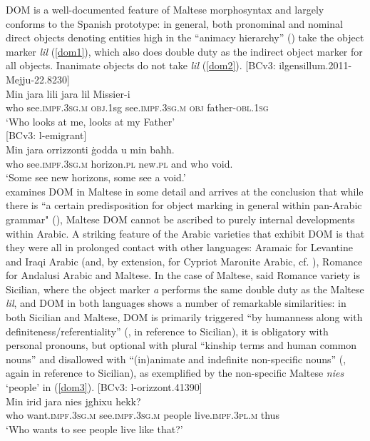 \documentclass[output=paper]{langsci/langscibook}
\begin{document}
DOM is a well-documented feature of Maltese morphosyntax and largely conforms to the Spanish prototype: in general, both pronominal and nominal direct objects denoting entities high in the ``animacy hierarchy'' (\citealt[55]{BorgAzzopardi-Alexander1997}) take the object marker \textit{lil} (\ref{dom1}), which also does double duty as the indirect object marker for all objects. Inanimate objects do not take \textit{lil} (\ref{dom2}).
\ea\label{dom1} 
{[BCv3: ilgensillum.2011-Mejju-22.8230]}\\
\gll Min jara lili jara lil Missier-i\\
	who see.\textsc{impf.3sg.m} \textsc{obj}.1sg see.\textsc{impf.3sg.m} \textsc{obj} father-\textsc{obl.1sg}\\
	\glt `Who looks at me, looks at my Father'\\
\z
\ea\label{dom2}
{[BCv3: l-emigrant]}\\
\gll Min jara orrizzonti ġodda u min baħħ.\\
	who see.\textsc{impf.3sg.m} horizon.\textsc{pl} new.\textsc{pl} and who void.\\
	\glt `Some see new horizons, some see a void.'\\
\z
 \cite{dohla2016} examines DOM in Maltese in some detail and arrives at the conclusion that while there is ``a certain predisposition for object marking in general within pan-Arabic grammar" (\citealt[169]{dohla2016}), Maltese DOM cannot be ascribed to purely internal developments within Arabic. A striking feature of the Arabic varieties that exhibit DOM is that they were all in prolonged contact with other languages: Aramaic for Levantine and Iraqi Arabic (and, by extension, for Cypriot Maronite Arabic, cf. \citealt[412]{Borg2004}), Romance for Andalusi Arabic and Maltese. In the case of Maltese, said Romance variety is Sicilian, where the object marker \textit{a} performs the same double duty as the Maltese \textit{lil}, and DOM in both languages shows a number of remarkable similarities: in both Sicilian and Maltese, DOM is primarily triggered ``by humanness along with definiteness/referentiality'' (\citealt[257]{iemmolo2010}, in reference to Sicilian), it is obligatory with personal pronouns, but optional with plural ``kinship terms and human common nouns'' and disallowed with ``(in)animate and indefinite non-specific nouns'' (\citealt[257]{iemmolo2010}, again in reference to Sicilian), as exemplified by the non-specific Maltese \textit{nies} `people' in (\ref{dom3}).
\ea\label{dom3} 
{[BCv3: l-orizzont.41390]}\\
\gll Min irid jara nies jgħixu hekk?\\
	who want.\textsc{impf.3sg.m} see.\textsc{impf.3sg.m} people live.\textsc{impf.3pl.m} thus\\
	\glt `Who wants to see people live like that?'\\
\z
\end{document}
